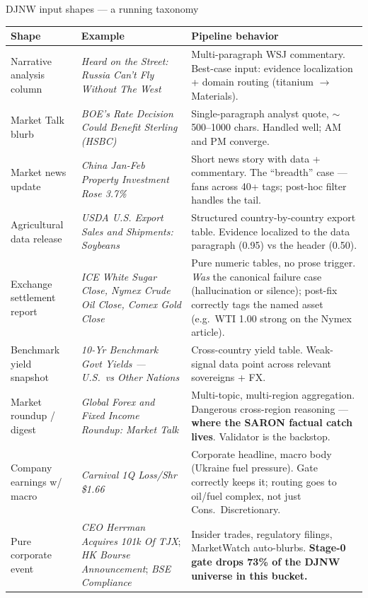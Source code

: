 \documentclass[10pt,aspectratio=169]{beamer}
\begin{document}
\begin{frame}{DJNW input shapes --- a running taxonomy}
  \tiny
  \setlength{\tabcolsep}{4pt}
  \renewcommand{\arraystretch}{1.12}
  \begin{tabular}{p{}p{}p{}}
    \toprule
    \textbf{Shape} & \textbf{Example} & \textbf{Pipeline behavior} \\
    \midrule
    Narrative analysis column & \emph{Heard on the Street: Russia Can't Fly Without The West}
    & Multi-paragraph WSJ commentary. Best-case input: evidence localization + domain routing
      (titanium $\rightarrow$ Materials). \\
    Market Talk blurb & \emph{BOE's Rate Decision Could Benefit Sterling (HSBC)}
    & Single-paragraph analyst quote, $\sim$500--1000 chars. Handled well; AM and PM
      converge. \\
    Market news update & \emph{China Jan-Feb Property Investment Rose 3.7\%}
    & Short news story with data + commentary. The ``breadth'' case --- fans across 40+ tags;
      post-hoc filter handles the tail. \\
    Agricultural data release & \emph{USDA U.S. Export Sales and Shipments: Soybeans}
    & Structured country-by-country export table. Evidence localized to the data paragraph
      (0.95) vs the header (0.50). \\
    Exchange settlement report & \emph{ICE White Sugar Close, Nymex Crude Oil Close, Comex
    Gold Close}
    & Pure numeric tables, no prose trigger. \emph{Was} the canonical failure case
      (hallucination or silence); post-fix correctly tags the named asset (e.g.\ WTI 1.00
      strong on the Nymex article). \\
    Benchmark yield snapshot & \emph{10-Yr Benchmark Govt Yields --- U.S.\ vs Other Nations}
    & Cross-country yield table. Weak-signal data point across relevant sovereigns + FX. \\
    Market roundup / digest & \emph{Global Forex and Fixed Income Roundup: Market Talk}
    & Multi-topic, multi-region aggregation. Dangerous cross-region reasoning ---
      \textbf{where the SARON factual catch lives}. Validator is the backstop. \\
    Company earnings w/ macro & \emph{Carnival 1Q Loss/Shr \$1.66}
    & Corporate headline, macro body (Ukraine fuel pressure). Gate correctly keeps it;
      routing goes to oil/fuel complex, not just Cons.\ Discretionary. \\
    Pure corporate event & \emph{CEO Herrman Acquires 101k Of TJX}; \emph{HK Bourse
    Announcement}; \emph{BSE Compliance}
    & Insider trades, regulatory filings, MarketWatch auto-blurbs.
      \textbf{Stage-0 gate drops 73\% of the DJNW universe in this bucket.} \\
    \bottomrule
  \end{tabular}


\end{frame}
\end{document}
